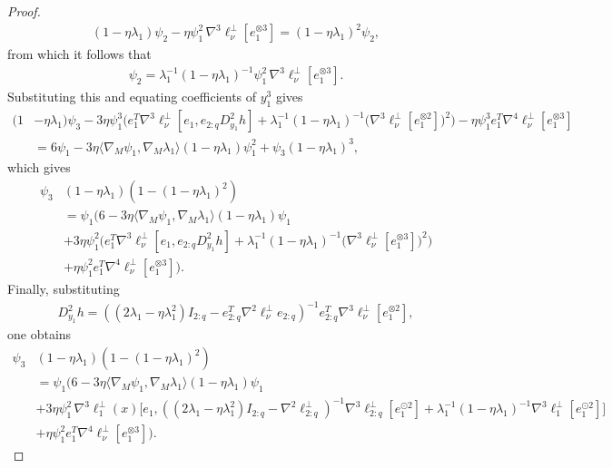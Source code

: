 \documentclass{article}
\theoremstyle{plain}
\theoremstyle{definition}
\theoremstyle{remark}
\begin{document}
\begin{proof}
    \begin{align}
    (1-\eta\lambda_1)\psi_2 - \eta\psi_1^2\,\nabla^3\ell^{\perp}_{\nu}[e_1^{\otimes 3}] = (1-\eta\lambda_1)^2\psi_2,
    \end{align}
    from which it follows that
    \begin{align}
    \psi_2 = \lambda_1^{-1}(1-\eta\lambda_1)^{-1}\psi_1^2\,\nabla^3\ell^{\perp}_{\nu}[e_1^{\otimes 3}].
    \end{align}
    Substituting this and equating coefficients of $ y_1^3$ gives
    \begin{align}
    (1&-\eta\lambda_1)\psi_3-3\eta\psi_1^3\bigg(e_1^T\nabla^3\ell^{\perp}_{\nu}[e_1,e_{2:q}D^2_{y_1}h]+ \lambda_1^{-1}(1-\eta\lambda_1)^{-1}\big(\nabla^3\ell^{\perp}_{\nu}[e_1^{\otimes 2}]\big)^2\bigg) - \eta\psi_1^3e_1^T\nabla^4\ell^{\perp}_{\nu}[e_1^{\otimes 3}]\\&=6\psi_1-3\eta\langle\nabla_M\psi_1,\nabla_M\lambda_1\rangle(1-\eta\lambda_1)\psi_1^2 + \psi_3(1-\eta\lambda_1)^3,
    \end{align}
    which gives
    \begin{align}
        \psi_3&(1-\eta\lambda_1)(1-(1-\eta\lambda_1)^2) \\&= \psi_1\bigg(6-3\eta\langle\nabla_M\psi_1,\nabla_M\lambda_1\rangle(1-\eta\lambda_1)\psi_1\\&+3\eta\psi_1^2\bigg(e_1^T\nabla^3\ell^{\perp}_{\nu}[e_1,e_{2:q}D^2_{y_1}h]+ \lambda_1^{-1}(1-\eta\lambda_1)^{-1}\big(\nabla^3\ell^{\perp}_{\nu}[e_1^{\otimes 3}]\big)^2\bigg)\\&+\eta\psi_1^2e_1^T\nabla^4\ell^{\perp}_{\nu}[e_1^{\otimes 3}]\bigg).
    \end{align}
    Finally, substituting
    \begin{align}
    D^2_{y_1}h = ((2\lambda_1-\eta\lambda_1^2)I_{2:q}-e_{2:q}^T\nabla^2\ell^{\perp}_{\nu}e_{2:q})^{-1}e_{2:q}^T\nabla^3\ell^{\perp}_{\nu}[e_1^{\otimes2}],
    \end{align}
    one obtains
    \begin{align}
        \psi_3&(1-\eta\lambda_1)(1-(1-\eta\lambda_1)^2) \\&= \psi_1\bigg(6-3\eta\langle\nabla_M\psi_1,\nabla_M\lambda_1\rangle(1-\eta\lambda_1)\psi_1\\&+3\eta\psi_1^2\,\nabla^3\ell^{\perp}_1(x)\big[e_1,((2\lambda_1-\eta\lambda_1^2)I_{2:q}-\nabla^2\ell^{\perp}_{2:q})^{-1}\nabla^3\ell^{\perp}_{2:q}[e_1^{\odot2}] + \lambda_1^{-1}(1-\eta\lambda_1)^{-1}\nabla^3\ell^{\perp}_1[e_1^{\odot2}]\big]\\&+\eta\psi_1^2e_1^T\nabla^4\ell^{\perp}_{\nu}[e_1^{\otimes 3}]\bigg).

\end{align}
\end{proof}
\end{document}
